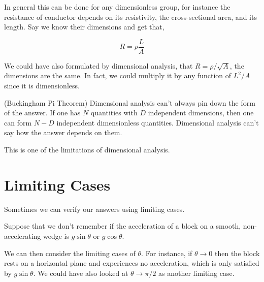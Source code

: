 In general this can be done for any dimensionless group, for instance the 
resistance of conductor depends on its resistivity, the cross-sectional area, 
and its length. Say we know their dimensions and get that, 

\begin{equation*}
    R = \rho \frac{L}{A}
\end{equation*}

We could have also formulated by dimensional analysis, that \(R = \rho/\sqrt{A}\), the 
dimensions are the same. In fact, we could multiply it by any function of 
\(L^2/A\) since it is dimensionless.

\begin{theorem}(Buckingham Pi Theorem)
    Dimensional analysis can't always pin down the form of the answer. If one has \(N\) 
    quantities with \(D\) independent dimensions, then one can form \(N - D\) 
    independent dimensionless quantities. Dimensional analysis can't say how the answer depends 
    on them.
\end{theorem}

This is one of the limitations of dimensional analysis.

\section{Limiting Cases}

Sometimes we can verify our answers using limiting cases.

Suppose that we don't remember if the acceleration of a block 
on a smooth, non-accelerating wedge is \(g\sin\theta\) or \(g\cos\theta\).

We can then consider the limiting cases of \(\theta\). For instance, 
if \(\theta \to 0\) then the block rests on a horizontal plane and experiences no 
acceleration, which is only satisfied by \(g\sin\theta\). We could have 
also looked at \(\theta \to \pi/2\) as another limiting case.

